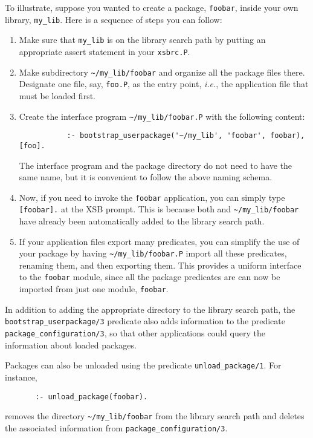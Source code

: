 To illustrate, suppose you wanted to create a package, {\tt foobar}, inside
your own library, {\tt my\_lib}. Here is a sequence of steps you can
follow:  
\begin{enumerate}
\item Make sure that {\tt my\_lib} is on the library search path by putting
  an appropriate assert statement in your {\tt xsbrc.P}.
\item Make subdirectory \verb|~/my_lib/foobar| and organize all the
  package files there. Designate one file, say, {\tt foo.P}, as the
  entry point, {\it i.e.}, the application file that must be loaded first.
\item Create the interface program \verb|~/my_lib/foobar.P| with the
  following content:
    \begin{verbatim}
           :- bootstrap_userpackage('~/my_lib', 'foobar', foobar), [foo].
    \end{verbatim}
  The interface program and the package directory do not need to have the
  same name, but it is convenient to follow the above naming schema.
\item Now, if you need to invoke the {\tt foobar} application, you can
  simply type \verb|[foobar].| at the XSB prompt. This is because both and
  \verb|~/my_lib/foobar| have already been automatically added to the
  library search path.
\item If your application files export many predicates, you can simplify
  the use of your package by having \verb|~/my_lib/foobar.P| import all
  these predicates, renaming them, and then exporting them. This provides a
  uniform interface to the {\tt foobar} module, since all the package
  predicates are can now be imported from just one module, {\tt foobar}.
\end{enumerate}
In addition to adding the appropriate directory to the library search
path, the \verb|bootstrap_userpackage/3| predicate also adds
information to the predicate \verb|package_configuration/3|, so that
other applications could query the information about loaded packages.

Packages can also be unloaded using the predicate
\verb|unload_package/1|. For instance, 

\begin{verbatim}
       :- unload_package(foobar).  
\end{verbatim}
removes the directory \verb|~/my_lib/foobar| from the library search path
and deletes the associated information from \verb|package_configuration/3|.

